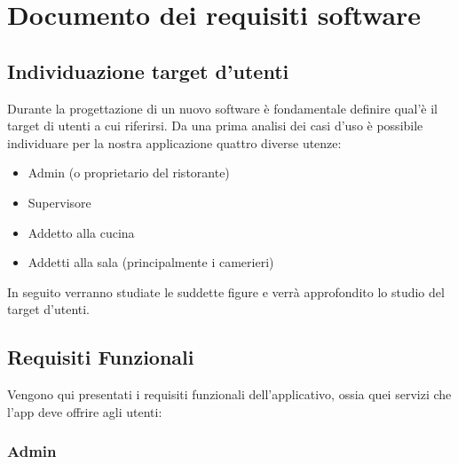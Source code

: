 \section{Documento dei requisiti software}
        \subsection{Individuazione target d'utenti}
                \begin{flushleft}
                Durante la progettazione di un nuovo software è
                fondamentale definire qual'è il target di utenti a cui riferirsi. Da una
                prima analisi dei casi d'uso è possibile individuare per la nostra applicazione
                quattro diverse utenze:
                        \begin{itemize}
                                \item Admin (o proprietario del ristorante)
                                \item Supervisore
                                \item Addetto alla cucina
                                \item Addetti alla sala (principalmente i camerieri)
                        \end{itemize}
                In seguito verranno studiate le suddette figure e verrà approfondito lo studio del target d'utenti.
                \end{flushleft}

    \subsection{Requisiti Funzionali}
        \begin{flushleft}  
            {\large
                Vengono qui presentati i requisiti funzionali dell'applicativo, ossia quei servizi che l'app  deve offrire agli utenti:
            } 
        \end{flushleft}
        
        \subsubsection{Admin}
        

